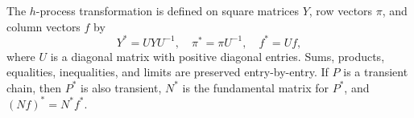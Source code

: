 The $h$-process transformation is defined on square matrices $Y$, row vectors $\pi$, and column vectors $f$ by
$$Y^* = UYU^{-1}, \quad \pi^* = \pi U^{-1}, \quad f^* = Uf,$$
where $U$ is a diagonal matrix with positive diagonal entries. Sums, products, equalities, inequalities, and limits are preserved entry-by-entry. If $P$ is a transient chain, then $P^*$ is also transient, $N^*$ is the fundamental matrix for $P^*$, and $(Nf)^* = N^* f^*$.
